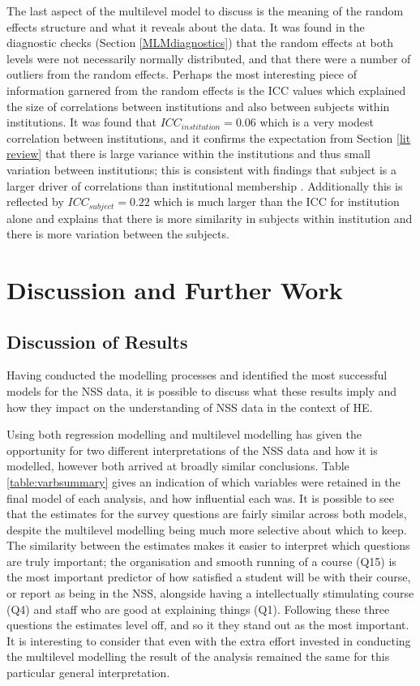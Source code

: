 \documentclass[11pt,a4paper]{report}
\begin{document}
The last aspect of the multilevel model to discuss is the meaning of the random effects structure and what it reveals about the data. It was found in the diagnostic checks (Section \ref{MLMdiagnostics}) that the random effects at both levels were not necessarily normally distributed, and that there were a number of outliers from the random effects. Perhaps the most interesting piece of information garnered from the random effects is the ICC values which explained the size of correlations between institutions and also between subjects within institutions. It was found that $ICC_{institution} = 0.06$ which is a very modest correlation between institutions, and it confirms the expectation from Section \ref{lit review} that there is large variance within the institutions and thus small variation between institutions; this is consistent with findings that subject is a larger driver of correlations than institutional membership \cite{cheng2010unicoursediffs, marshandcheng2008}. Additionally this is reflected by $ICC_{subject} = 0.22$ which is much larger than the ICC for institution alone and explains that there is more similarity in subjects within institution and there is more variation between the subjects. 


\newpage
\chapter{Discussion and Further Work}

\section{Discussion of Results}
Having conducted the modelling processes and identified the most successful models for the NSS data, it is possible to discuss what these results imply and how they impact on the understanding of NSS data in the context of HE. 

Using both regression modelling and multilevel modelling has given the opportunity for two different interpretations of the NSS data and how it is modelled, however both arrived at broadly similar conclusions. Table \ref{table:varbsummary} gives an indication of which variables were retained in the final model of each analysis, and how influential each was. It is possible to see that the estimates for the survey questions are fairly similar across both models, despite the multilevel modelling being much more selective about which to keep. The similarity between the estimates makes it easier to interpret which questions are truly important; the organisation and smooth running of a course (Q15) is the most important predictor of how satisfied a student will be with their course, or report as being in the NSS, alongside having a intellectually stimulating course (Q4) and staff who are good at explaining things (Q1). Following these three questions the estimates level off, and so it they stand out as the most important. It is interesting to consider that even with the extra effort invested in conducting the multilevel modelling the result of the analysis remained the same for this particular general interpretation. 
\end{document}
